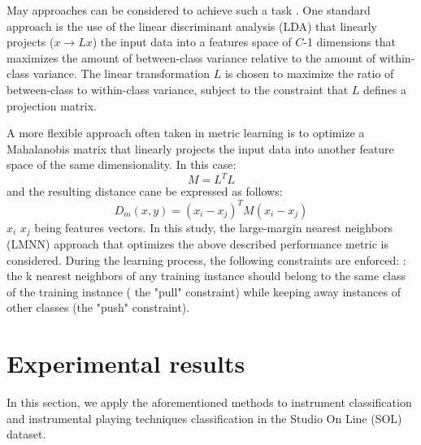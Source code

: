 \documentclass{article}
\begin{document}
May approaches can be considered to achieve such a task \cite{}. One standard approach is the use of the linear discriminant analysis (LDA) that linearly projects ($x \rightarrow L x$) the input data into a features space of $C$-1 dimensions that maximizes the amount of between-class variance
relative to the amount of within-class variance. The linear transformation $L$ is chosen to maximize the ratio of between-class to within-class variance,
subject to the constraint that $L$ defines a projection matrix.


A more flexible approach often taken in metric learning \cite{bellet2013survey} is to optimize a Mahalanobis matrix that linearly projects the input data into another feature space of the same dimensionality. In this case:
\begin{equation}
  M=L^T L
\end{equation}
and the resulting distance cane be expressed as follows:
\begin{equation}
  D_m(x, y) = (x_i-x_j)^T M(x_i-x_j)
\end{equation}
$x_i$ $x_j$ being features vectors. In this study, the large-margin nearest neighbors (LMNN) approach \cite{weinberger2006nips, weinberger2009jmlr} that optimizes the above described performance metric is considered. During the learning process, the following constraints are enforced: : the
k nearest neighbors of any training instance should belong to the
same class of the training instance ( the "pull" constraint) while keeping away instances of other classes (the "push" constraint).




\section{Experimental results} \label{sec:exp}
In this section, we apply the aforementioned methods to instrument classification and instrumental playing techniques classification in the Studio On Line (SOL) dataset.
\end{document}
